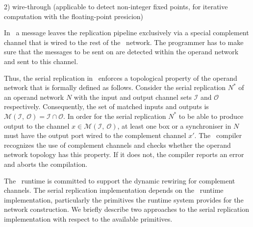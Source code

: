 2) wire-through (applicable to detect non-integer fixed points, for iterative computation with the floating-point presicion)




In \ak\, a message leaves the replication pipeline exclusively via a special complement channel that is wired to the rest of the \ak\ network. The programmer has to make sure that the messages to be sent on are detected within the operand network and sent to this channel. 

Thus, the serial replication in \ak\ enforces a topological property of the operand network that is formally defined as follows. Consider the serial replication $N^{*}$ of an operand network $N$ with the input and output channel sets $\mathcal{I}$ and $\mathcal{O}$ respectively. Consequently, the set of matched inputs and outputs is $\mathcal{M}(\mathcal{I}, \: \mathcal{O}) = \mathcal{I} \cap \mathcal{O}$. In order for the serial replication $N^{*}$ to be able to produce output to the channel $x \in \mathcal{M}(\mathcal{I}, \: \mathcal{O})$, at least one box or a synchroniser in $N$ must have the output port wired to the complement channel $x'$. The \ak\ compiler recognizes the use of complement channels and checks whether the operand network topology has this property. If it does not, the compiler reports an error and aborts the compilation.

The \ak\ runtime is committed to support the dynamic rewiring for complement channels. The serial replication implementation depends on the \ak\ runtime implementation, particularly the primitives the runtime system provides for the network construction. We briefly describe two approaches to the serial replication implementation with respect to the available primitives.


